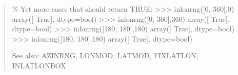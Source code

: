 \documentclass[letterpaper,10pt,english]{sphinxmanual}
\begin{document}
\begin{fulllineitems}
\begin{quote}
\begin{description}
\% Yet more cases that should return TRUE:
\textgreater{}\textgreater{}\textgreater{} inlonrng({[}0, 360{]},0)
array({[} True{]}, dtype=bool)
\textgreater{}\textgreater{}\textgreater{} inlonrng({[}0, 360{]},360)
array({[} True{]}, dtype=bool)
\textgreater{}\textgreater{}\textgreater{} inlonrng({[}\sphinxhyphen{}180, 180{]},\sphinxhyphen{}180)
array({[} True{]}, dtype=bool)
\textgreater{}\textgreater{}\textgreater{} inlonrng({[}\sphinxhyphen{}180, 180{]},180)
array({[} True{]}, dtype=bool)

\end{description}

See also: AZINRNG, LONMOD, LATMOD, FIXLATLON, INLATLONBOX
\end{quote}

\end{fulllineitems}

\end{document}
